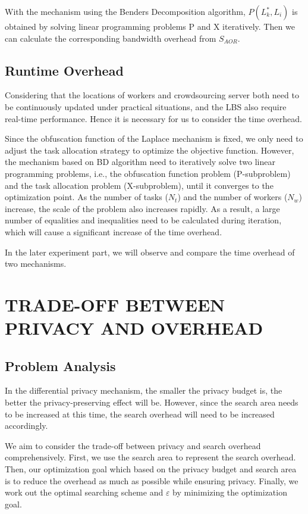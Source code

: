 With the mechanism using the Benders Decomposition algorithm, $P(L^*_k,L_i)$ is obtained by solving linear programming problems P and X iteratively. Then we can calculate the corresponding bandwidth overhead from $S_{AOR}$. 

\subsection{Runtime Overhead}
Considering that the locations of workers and crowdsourcing server both need to be continuously updated under practical situations, and the LBS also require real-time performance. Hence it is necessary for us to consider the time overhead.

Since the obfuscation function of the Laplace mechanism is fixed, we only need to adjust the task allocation strategy to optimize the objective function. However, the mechanism based on BD algorithm need to iteratively solve two linear programming problems, i.e., the obfuscation function problem (P-subproblem) and the task allocation problem (X-subproblem), until it converges to the optimization point. As the number of tasks ($N_t$) and the number of workers ($N_w$) increase, the scale of the problem also increases rapidly. As a result, a large number of equalities and inequalities need to be calculated during iteration, which will cause a significant increase of the time overhead.

In the later experiment part, we will observe and compare the time overhead of two mechanisms.

\section{TRADE-OFF BETWEEN PRIVACY AND OVERHEAD}
\subsection{Problem Analysis}
In the differential privacy mechanism, the smaller the privacy budget is, the better the privacy-preserving effect will be. However, since the search area needs to be increased at this time, the search overhead will need to be increased accordingly.

We aim to consider the trade-off between privacy and search overhead comprehensively. First, we use the search area to represent the search overhead. Then, our optimization goal which based on the privacy budget and search area is to reduce the overhead as much as possible while ensuring privacy. Finally, we work out the optimal searching scheme and $\varepsilon$ by minimizing the optimization goal.

